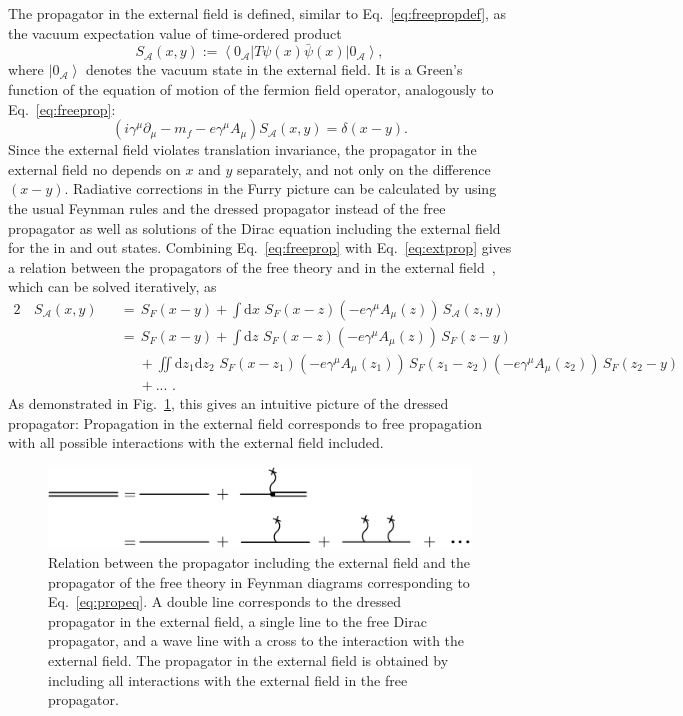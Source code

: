 The propagator in the external field is defined, similar to Eq.~\eqref{eq:freepropdef}, as the vacuum expectation value of time-ordered product
\begin{equation}
S_{\mathcal{A}}(x,y):=\left<0_\mathcal{A}\right|T\psi(x)\bar{\psi}(x) \left|0_\mathcal{A}\right>,
\label{eq:extpropdef}
\end{equation}
where $\left|0_\mathcal{A}\right>$ denotes the vacuum state in the external field.
It is a Green's function of the equation of motion of the fermion field operator, analogously to Eq.~\eqref{eq:freeprop}:
\begin{equation}
\left(i\gamma^\mu \partial_\mu -m_f - e \gamma^\mu A_\mu\right)S_{\mathcal{A}}(x,y)=\delta(x-y).
\label{eq:extprop}
\end{equation}
Since the external field violates translation invariance, the propagator in the external field no depends on $x$ and $y$ separately, and not only on the difference $(x-y)$. Radiative corrections in the Furry picture can be calculated by using the usual Feynman rules and the dressed propagator instead of the free propagator as well as solutions of the Dirac equation including the external field for the in and out states. Combining Eq.~\eqref{eq:freeprop} with Eq.~\eqref{eq:extprop} gives a relation between the propagators of the free theory and in the external field~\mbox{\cite[Section 2.5.]{itzykson2005}}, which can be solved iteratively, as
\begin{alignat}{2}
&\,S_{\mathcal{A}}(x,y)&&= \,S_F(x-y) 
+ \int\mathrm{d}x\, \,S_F(x-z)\left(-e\gamma^\mu A_\mu(z)\right)\,S_{\mathcal{A}}(z,y)\\
& &&=\,S_F(x-y)+\int\mathrm{d}z\,\,S_F(x-z)(-e\gamma^\mu A_\mu(z))\,S_F(z-y)\\
&&&\phantom{=}+\iint\mathrm{d}z_1\mathrm{d}z_2\,\,S_F(x-z_1)(-e\gamma^\mu A_\mu(z_1))\,S_F(z_1-z_2)(-e\gamma^\mu A_\mu(z_2))\,S_F(z_2-y)\\
&&&\phantom{=}+...\,\,.\label{eq:propeq}
\end{alignat}
As demonstrated in Fig.~\ref{fig:propagator}, this gives an intuitive picture of the dressed propagator: Propagation in the external field corresponds to free propagation with all possible interactions with the external field included.
%
\begin{figure}%
\centering
\includegraphics[width=0.9\linewidth]{pics/propagator.pdf}%
\caption{Relation between the propagator including the external field and the propagator of the free theory in Feynman diagrams corresponding to Eq.~\eqref{eq:propeq}. A double line corresponds to the dressed propagator in the external field, a single line to the free Dirac propagator, and a wave line with a cross to the interaction with the external field. The propagator in the external field is obtained by including all interactions with the external field in the free propagator.}%
\label{fig:propagator}%
\end{figure}
